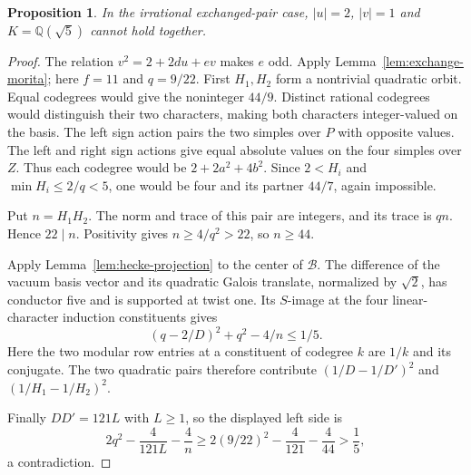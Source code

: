 \documentclass[11pt,a4paper]{article}
\newtheorem{proposition}[theorem]{Proposition}
\numberwithin{equation}{section}
\begin{document}
\begin{proposition}\label{prop:exchange-eleven}
In the irrational exchanged-pair case, $|u|=2$, $|v|=1$ and
$K=\mathbb Q(\sqrt5)$ cannot hold together.
\end{proposition}
\begin{proof}
The relation $v^2=2+2du+ev$ makes $e$ odd. Apply
Lemma~\ref{lem:exchange-morita}; here $f=11$ and $q=9/22$.
First $H_1,H_2$ form a nontrivial quadratic orbit. Equal codegrees
would give the noninteger $44/9$. Distinct rational codegrees would
distinguish their two characters, making both characters integer-valued
on the basis. The left sign action pairs the two simples over $P$
with opposite values. The left and right sign actions give equal
absolute values on the four simples over $Z$. Thus each codegree
would be $2+2a^2+4b^2$. Since $2<H_i$ and
$\min H_i\le2/q<5$, one would be four and its partner $44/7$,
again impossible.

Put $n=H_1H_2$. The norm and trace of this pair are integers,
and its trace is $qn$. Hence $22\mid n$. Positivity gives
$n\ge4/q^2>22$, so $n\ge44$.

Apply Lemma~\ref{lem:hecke-projection} to the center of $\mathcal B$.
The difference of the vacuum basis vector and its quadratic Galois
translate, normalized by $\sqrt2$, has conductor five and is supported
at twist one. Its $S$-image at the four linear-character induction
constituents gives
\[
 (q-2/D)^2+q^2-4/n\le1/5.
\]
Here the two modular row entries at a constituent of codegree $k$
are $1/k$ and its conjugate. The two quadratic pairs therefore
contribute $(1/D-1/D')^2$ and $(1/H_1-1/H_2)^2$.

Finally $DD'=121L$ with $L\ge1$, so the displayed left side is
\[
 2q^2-\frac4{121L}-\frac4n
 \ge2(9/22)^2-\frac4{121}-\frac4{44}>\frac15,
\]
a contradiction.
\end{proof}
\end{document}
